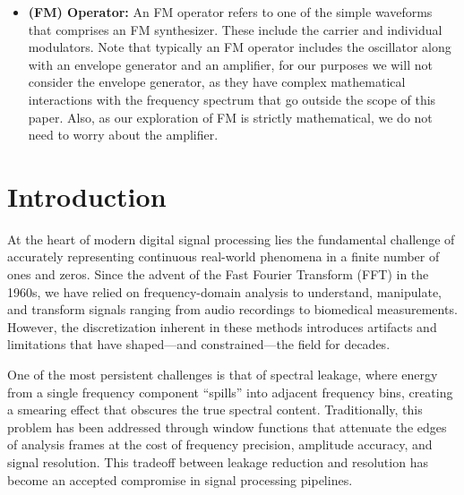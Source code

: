 \documentclass[11pt,twoside]{report}
\numberwithin{thm}{section}
\numberwithin{equation}{section}
\begin{document}
\begin{itemize}
    \item \textbf{(FM) Operator: }An FM operator refers to one of the simple waveforms that comprises an FM synthesizer. These include the carrier and individual modulators. Note that typically an FM operator includes the oscillator along with an envelope generator and an amplifier, for our purposes we will not consider the envelope generator, as they have complex mathematical interactions with the frequency spectrum that go outside the scope of this paper. Also, as our exploration of FM is strictly mathematical, we do not need to worry about the amplifier. 

\end{itemize}




\makeatletter 
\if@twoside \ifodd\value{page}
\clearpage\mbox{}\thispagestyle{empty} \fi \fi
\makeatother 



\clearpage
{}

\chapter*{Introduction}
At the heart of modern digital signal processing lies the fundamental challenge of accurately representing continuous real-world phenomena in a finite number of ones and zeros. Since the advent of the Fast Fourier Transform (FFT) in the 1960s, we have relied on frequency-domain analysis to understand, manipulate, and transform signals ranging from audio recordings to biomedical measurements. However, the discretization inherent in these methods introduces artifacts and limitations that have shaped—and constrained—the field for decades.

One of the most persistent challenges is that of spectral leakage, where energy from a single frequency component ``spills'' into adjacent frequency bins, creating a smearing effect that obscures the true spectral content. Traditionally, this problem has been addressed through window functions that attenuate the edges of analysis frames at the cost of frequency precision, amplitude accuracy, and signal resolution. This tradeoff between leakage reduction and resolution has become an accepted compromise in signal processing pipelines.
\end{document}
